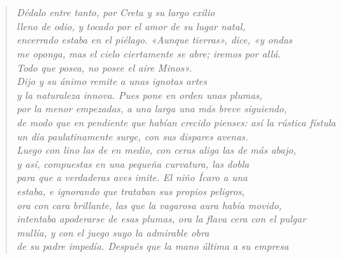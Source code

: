 \section{}


\begin{quote}
    {
        \textit{
            Dédalo entre tanto, por Creta y su largo exilio\\
            lleno de odio, y tocado por el amor de su lugar natal,\\
            encerrado estaba en el piélago. «Aunque tierras», dice, «y ondas\\
            me oponga, mas el cielo ciertamente se abre; iremos por allá.\\
            Todo que posea, no posee el aire Minos».\\
            Dijo y su ánimo remite a unas ignotas artes\\
            y la naturaleza innova. Pues pone en orden unas plumas,\\
            por la menor empezadas, a una larga una más breve siguiendo,\\
            de modo que en pendiente que habían crecido pienses: así la rústica fístula\\
            un día paulatinamente surge, con sus dispares avenas.\\
            Luego con lino las de en medio, con ceras aliga las de más abajo,\\
            y así, compuestas en una pequeña curvatura, las dobla\\
            para que a verdaderas aves imite. El niño Ícaro a una\\
            estaba, e ignorando que trataban sus propios peligros,\\
            ora con cara brillante, las que la vagarosa aura había movido,\\
            intentaba apoderarse de esas plumas, ora la flava cera con el pulgar\\
            mullía, y con el juego suyo la admirable obra\\
            de su padre impedía. Después que la mano última a su empresa\\
}}
\end{quote}
